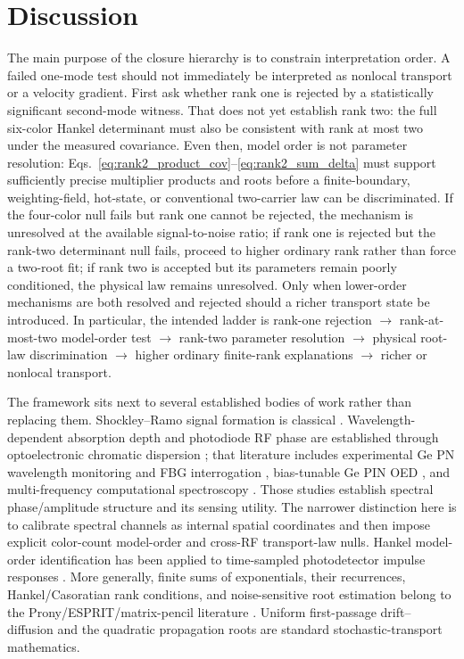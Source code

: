\documentclass[11pt]{article}
\begin{document}
\section{Discussion}

The main purpose of the closure hierarchy is to constrain interpretation order. A failed one-mode test should not immediately be interpreted as nonlocal transport or a velocity gradient. First ask whether rank one is rejected by a statistically significant second-mode witness. That does not yet establish rank two: the full six-color Hankel determinant must also be consistent with rank at most two under the measured covariance. Even then, model order is not parameter resolution: Eqs.~\eqref{eq:rank2_product_cov}--\eqref{eq:rank2_sum_delta} must support sufficiently precise multiplier products and roots before a finite-boundary, weighting-field, hot-state, or conventional two-carrier law can be discriminated. If the four-color null fails but rank one cannot be rejected, the mechanism is unresolved at the available signal-to-noise ratio; if rank one is rejected but the rank-two determinant null fails, proceed to higher ordinary rank rather than force a two-root fit; if rank two is accepted but its parameters remain poorly conditioned, the physical law remains unresolved. Only when lower-order mechanisms are both resolved and rejected should a richer transport state be introduced. In particular, the intended ladder is rank-one rejection $\rightarrow$ rank-at-most-two model-order test $\rightarrow$ rank-two parameter resolution $\rightarrow$ physical root-law discrimination $\rightarrow$ higher ordinary finite-rank explanations $\rightarrow$ richer or nonlocal transport.

The framework sits next to several established bodies of work rather than replacing them. Shockley--Ramo signal formation is classical \cite{Shockley1938,Ramo1939,Dabrowski1989}. Wavelength-dependent absorption depth and photodiode RF phase are established through optoelectronic chromatic dispersion \cite{Glasser2021}; that literature includes experimental Ge PN wavelength monitoring and FBG interrogation \cite{Liokumovitch2021}, bias-tunable Ge PIN OED \cite{Dutta2024}, and multi-frequency computational spectroscopy \cite{Kassa2026}. Those studies establish spectral phase/amplitude structure and its sensing utility. The narrower distinction here is to calibrate spectral channels as internal spatial coordinates and then impose explicit color-count model-order and cross-RF transport-law nulls. Hankel model-order identification has been applied to time-sampled photodetector impulse responses \cite{Sun2025}. More generally, finite sums of exponentials, their recurrences, Hankel/Casoratian rank conditions, and noise-sensitive root estimation belong to the Prony/ESPRIT/matrix-pencil literature \cite{Prony1795,RoyKailath1989,HuaSarkar1990}. Uniform first-passage drift--diffusion and the quadratic propagation roots are standard stochastic-transport mathematics.
\end{document}
